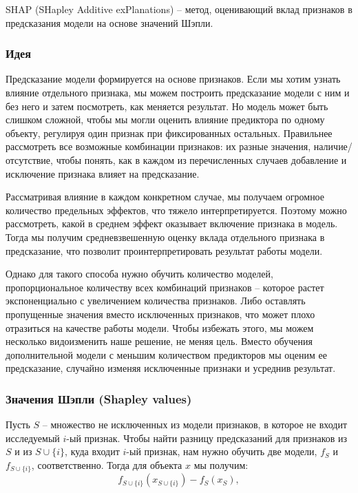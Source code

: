 SHAP (SHapley Additive exPlanations) -- метод, оценивающий вклад признаков в предсказания модели на основе значений Шэпли.

\subsubsection{Идея}
Предсказание модели формируется на основе признаков. Если мы хотим узнать влияние отдельного признака, мы можем построить предсказание модели с ним и без него и затем посмотреть, как меняется результат. %
Но модель может быть слишком сложной, чтобы мы могли оценить влияние предиктора по одному объекту, регулируя один признак при фиксированных остальных. %
Правильнее рассмотреть все возможные комбинации признаков: их разные значения, наличие/отсутствие, чтобы понять, как в каждом из перечисленных случаев добавление и исключение признака влияет на предсказание.

Рассматривая влияние в каждом конкретном случае, мы получаем огромное количество предельных эффектов, что тяжело интерпретируется. Поэтому можно рассмотреть, какой в среднем эффект оказывает включение признака в модель. Тогда мы получим средневзвешенную оценку вклада отдельного признака в предсказание, что позволит проинтерпретировать результат работы модели.

Однако для такого способа нужно обучить количество моделей, пропорциональное количеству всех комбинаций признаков -- которое растет экспоненциально с увеличением количества признаков. Либо оставлять пропущенные значения вместо исключенных признаков, что может плохо отразиться на качестве работы модели. Чтобы избежать этого, мы можем несколько видоизменить наше решение, не меняя цель. Вместо обучения дополнительной модели с меньшим количеством предикторов мы оценим ее предсказание, случайно изменяя исключенные признаки и усреднив результат.


\subsubsection{Значения Шэпли (Shapley values)}
Пусть $S$ -- множество не исключенных из модели признаков, в которое не входит исследуемый $i$-ый признак. Чтобы найти разницу предсказаний для признаков из $S$ и из $S \cup \{i\}$, куда входит $i$-ый признак, нам нужно обучить две модели, $f_S$ и $f_{S \cup \{i\}}$, соответственно. Тогда для объекта $x$ мы получим:
\[
f_{S \cup \{i\}}(x_{S \cup \{i\}}) - f_S(x_S),
\]

